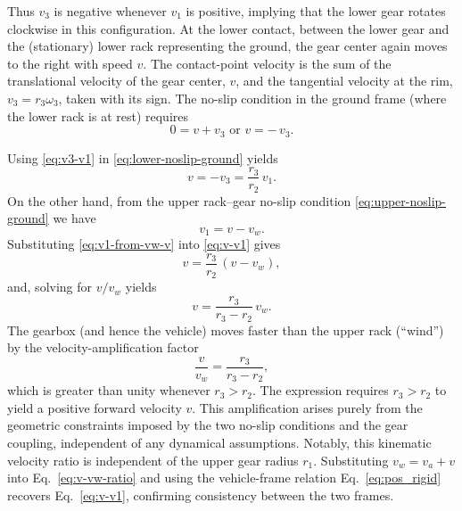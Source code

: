 \documentclass[a4paper]{article}
\begin{document}
Thus \(v_3\) is negative whenever \(v_1\) is positive, implying that the lower
gear rotates clockwise in this configuration.
At the lower contact, between the lower gear and the (stationary) lower rack
representing the ground, the gear center again moves to the right with speed
$v$.
The contact-point velocity is the sum of the translational velocity of the gear
center, \(v\), and the tangential velocity at the rim, \(v_3 = r_3 \omega_3\),
taken with its sign.
The no-slip condition in the ground frame (where the lower rack is at rest)
requires
\begin{equation}
0 = v + v_3
\text{ or }
v = -\,v_3.
\label{eq:lower-noslip-ground}
\end{equation}

Using \eqref{eq:v3-v1} in \eqref{eq:lower-noslip-ground} yields
\begin{equation}
v = -v_3 = \frac{r_3}{r_2}\,v_1.
\label{eq:v-v1}
\end{equation}
On the other hand, from the upper rack--gear no-slip condition
\eqref{eq:upper-noslip-ground} we have
\begin{equation}
v_1 = v - v_w.
\label{eq:v1-from-vw-v}
\end{equation}
Substituting \eqref{eq:v1-from-vw-v} into \eqref{eq:v-v1} gives
\[
v = \frac{r_3}{r_2}\,(v - v_w),
\]
and, solving for $ {v}/{v_w}$  yields
\begin{equation}
 v = \frac{r_3}{r_3 - r_2}\, {v_w}.
\label{eq:v-vw-ratio}
\end{equation}
The gearbox (and hence the vehicle) moves faster than the upper rack
(``wind'') by the velocity-amplification factor
\begin{equation}
 \frac{v}{v_w} = \frac{r_3}{r_3 - r_2},
\label{eq:amp-v-vw-ratio}
\end{equation}
which is greater than unity whenever $r_3 > r_2$.
The expression requires \(r_3 > r_2\) to yield a positive forward velocity \(v\).
This amplification arises purely from the geometric constraints imposed by
the two no-slip conditions and the gear coupling, independent of any
dynamical assumptions.
Notably, this kinematic
velocity ratio is independent of the upper gear radius $r_1$.
Substituting $v_w= v_a + v$ into Eq.~\eqref{eq:v-vw-ratio} and using the vehicle-frame relation Eq.~\eqref{eq:pos_rigid} recovers Eq.~\eqref{eq:v-v1}, confirming consistency between the two frames.
\end{document}

